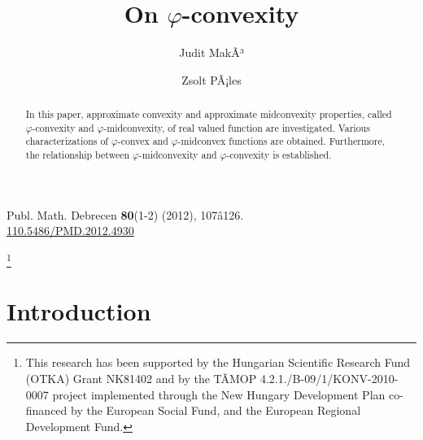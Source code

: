 \documentclass[12pt,leqno]{amsart}
\theoremstyle{definition}
\begin{document}
\begin{flushright}
Publ. Math. Debrecen \textbf{80}(1-2) (2012), 107â126. \\
\href{http://dx.doi.org/110.5486/PMD.2012.4930}{110.5486/PMD.2012.4930} \\[1cm]
\end{flushright}

\title[]{On $\varphi$-convexity}
\author[J.\ MakÃ³]{Judit MakÃ³}
\author[Zs. PÃ¡les]{Zsolt PÃ¡les}
\address{Institute of Mathematics, University of Debrecen,
H-4010 Debrecen, Pf.\ 12, Hungary}


\thanks{This research has been supported by the Hungarian Scientific Research Fund (OTKA) Grant
NK81402 and by the TÃMOP 4.2.1./B-09/1/KONV-2010-0007 project implemented through the New
Hungary Development Plan co-financed by the European Social Fund, and the European Regional
Development Fund.}

\begin{abstract}
In this paper, approximate convexity and approximate midconvexity properties,
called $\varphi$-convexity and $\varphi$-midconvexity, of real valued function are investigated.
Various characterizations of $\varphi$-convex and $\varphi$-midconvex functions are obtained.
Furthermore, the relationship between $\varphi$-midconvexity and $\varphi$-convexity is established.
\end{abstract}

\maketitle

\section{Introduction}
\end{document}
